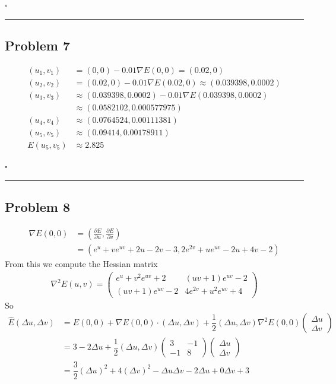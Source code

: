 \documentclass[12pt]{article}
\newcommand*{\QEDB}{\hfill\ensuremath{\square}}
\newcommand{\ParTh}[1]{\left(#1\right)}
\newcommand{\Matrix}[2]{\ParTh{\begin{array}{#1}#2\end{array}}}
\newcommand{\horrule}[1]{\rule{\linewidth}{#1}}
\begin{document}
\QEDB

\horrule{0.5pt}

\subsection*{Problem 7}

\begin{align}
\ParTh{u_1,v_1}&=\ParTh{0,0}-0.01\nabla E\ParTh{0,0}=\ParTh{0.02,0}\\
\ParTh{u_2,v_2}&=\ParTh{0.02,0}-0.01\nabla E\ParTh{0.02,0}\approx\ParTh{0.039398,0.0002}\\
\ParTh{u_3,v_3}&\approx\ParTh{0.039398,0.0002}-0.01\nabla E\ParTh{0.039398,0.0002}\\&\approx\ParTh{0.0582102,0.000577975}\\
\ParTh{u_4,v_4}&\approx\ParTh{0.0764524,0.00111381}\\
\ParTh{u_5,v_5}&\approx\ParTh{0.09414,0.00178911}\\
E\ParTh{u_5,v_5}&\approx2.825
\end{align}

\QEDB

\horrule{0.5pt}

\subsection*{Problem 8}

\begin{align}
\nabla E(0,0) &= \ParTh{\frac{\partial E}{\partial u},\frac{\partial E}{\partial v}}\\
&=\ParTh{e^{u}+ve^{uv}+2u-2v-3,2e^{2v}+ue^{uv}-2u+4v-2}
\end{align}
From this we compute the Hessian matrix
\begin{align}
\nabla^2E\ParTh{u,v}=\Matrix{cc}{e^{u}+v^2e^{uv}+2&\ParTh{uv+1}e^{uv}-2\\\ParTh{uv+1}e^{uv}-2&4e^{2v}+u^2e^{uv}+4}
\end{align}
So
\begin{align}
\hat{E}\ParTh{\Delta u,\Delta v}&=E\ParTh{0,0}+\nabla E\ParTh{0,0}\cdot\ParTh{\Delta u,\Delta v}+\dfrac{1}{2}\ParTh{\Delta u,\Delta v}\nabla^2E\ParTh{0,0}\Matrix{c}{\Delta u\\\Delta v}\\
&=3-2\Delta u+\dfrac{1}{2}\ParTh{\Delta u,\Delta v}\Matrix{cc}{3&-1\\-1&8}\Matrix{c}{\Delta u\\\Delta v}\\
&=\dfrac{3}{2}\ParTh{\Delta u}^2+4\ParTh{\Delta v}^2-\Delta u\Delta v-2\Delta u+0\Delta v+3
\end{align}
\end{document}
